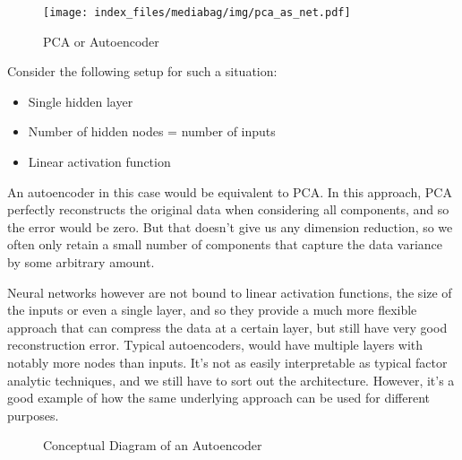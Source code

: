 \documentclass[
  letterpaper,
]{krantz}
\providecommand{\tightlist}{%
  \setlength{\itemsep}{0pt}\setlength{\parskip}{0pt}}\usepackage{longtable,booktabs,array}
\begin{document}
\begin{figure}[H]

{\centering \texttt{[image: index\_files/mediabag/img/pca\_as\_net.pdf]}

}

\caption{PCA or Autoencoder}

\end{figure}%

Consider the following setup for such a situation:

\begin{itemize}
\tightlist
\item
  Single hidden layer
\item
  Number of hidden nodes = number of inputs
\item
  Linear activation function
\end{itemize}

An autoencoder in this case would be equivalent to PCA. In this
approach, PCA perfectly reconstructs the original data when considering
all components, and so the error would be zero. But that doesn't give us
any dimension reduction, so we often only retain a small number of
components that capture the data variance by some arbitrary amount.

Neural networks however are not bound to linear activation functions,
the size of the inputs or even a single layer, and so they provide a
much more flexible approach that can compress the data at a certain
layer, but still have very good reconstruction error. Typical
autoencoders, would have multiple layers with notably more nodes than
inputs. It's not as easily interpretable as typical factor analytic
techniques, and we still have to sort out the architecture. However,
it's a good example of how the same underlying approach can be used for
different purposes.

\begin{figure}[H]


\caption{\label{fig-autoencoder}Conceptual Diagram of an Autoencoder}

\end{figure}%
\end{document}
